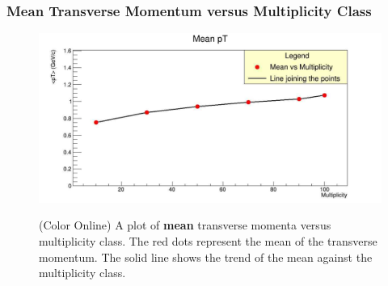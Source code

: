 \documentclass[letterpaper,aps,prc,superscriptaddress,nofootinbib,10pt,showpacs,floatfix]{revtex4-2}%
\begin{document}
\subsubsection{Mean Transverse Momentum versus Multiplicity Class}
\label{subsubsec:mean}
\vspace{-5mm}
\begin{figure}[!htb]
	\begin{minipage}{1\textwidth}
   		\label{Fig:6}
     	\centering
     	\renewcommand{\thefigure}{6}
     	\includegraphics[width=\linewidth]{mean}
     	\begin{minipage}{0.8\textwidth}
     	\caption{(Color Online) A plot of \textbf{mean} transverse momenta versus multiplicity class. The red dots represent the mean of the transverse momentum. The solid line shows the trend of the mean against the multiplicity class.}
     	\end{minipage}
     \end{minipage}
\end{figure}

\FloatBarrier
\vspace{-3mm}
\end{document}
